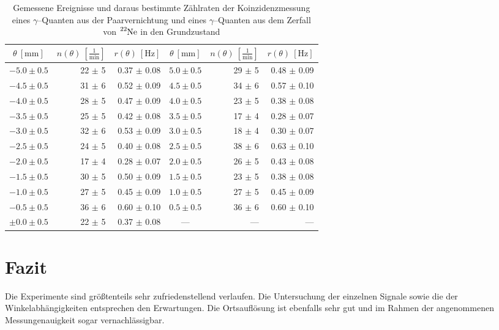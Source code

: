 \documentclass[12pt,a4paper]{scrartcl}
\numberwithin{equation}{section} %
\begin{document}
\begin{table}[h!]
	\centering
	\begin{tabular}{c|r|r||c|r|r}
		$\theta\ [\mathrm{mm}]$ & $n(\theta)\ [\frac{1}{\mathrm{min}}]$ & $r(\theta)\ [\mathrm{Hz}]$ &
			$\theta\ [\mathrm{mm}]$ & $n(\theta)\ [\frac{1}{\mathrm{min}}]$ & $r(\theta)\ [\mathrm{Hz}]$ \\
		\hline 
		$-5.0 \pm 0.5$ & 22 $\pm$ 5 & 0.37 $\pm$ 0.08 &
			$5.0 \pm 0.5$ & 29 $\pm$ 5 & 0.48 $\pm$ 0.09 \\
		$-4.5 \pm 0.5$ & 31 $\pm$ 6 & 0.52 $\pm$ 0.09 &
			$4.5 \pm 0.5$ & 34 $\pm$ 6 & 0.57 $\pm$ 0.10 \\
		$-4.0 \pm 0.5$ & 28 $\pm$ 5 & 0.47 $\pm$ 0.09 &
			$4.0 \pm 0.5$ & 23 $\pm$ 5 & 0.38 $\pm$ 0.08 \\
		$-3.5 \pm 0.5$ & 25 $\pm$ 5 & 0.42 $\pm$ 0.08 &
			$3.5 \pm 0.5$ & 17 $\pm$ 4 & 0.28 $\pm$ 0.07 \\
		$-3.0 \pm 0.5$ & 32 $\pm$ 6 & 0.53 $\pm$ 0.09 &
			$3.0 \pm 0.5$ & 18 $\pm$ 4 & 0.30 $\pm$ 0.07 \\
		$-2.5 \pm 0.5$ & 24 $\pm$ 5 & 0.40 $\pm$ 0.08 &
			$2.5 \pm 0.5$ & 38 $\pm$ 6 & 0.63 $\pm$ 0.10 \\
		$-2.0 \pm 0.5$ & 17 $\pm$ 4 & 0.28 $\pm$ 0.07 &
			$2.0 \pm 0.5$ & 26 $\pm$ 5 & 0.43 $\pm$ 0.08 \\
		$-1.5 \pm 0.5$ & 30 $\pm$ 5 & 0.50 $\pm$ 0.09 &
			$1.5 \pm 0.5$ & 23 $\pm$ 5 & 0.38 $\pm$ 0.08 \\
		$-1.0 \pm 0.5$ & 27 $\pm$ 5 & 0.45 $\pm$ 0.09 &
			$1.0 \pm 0.5$ & 27 $\pm$ 5 & 0.45 $\pm$ 0.09 \\
		$-0.5 \pm 0.5$ & 36 $\pm$ 6 & 0.60 $\pm$ 0.10 &
			$0.5 \pm 0.5$ & 36 $\pm$ 6 & 0.60 $\pm$ 0.10 \\
		$\pm 0.0 \pm 0.5$ & 22 $\pm$ 5 & 0.37 $\pm$ 0.08 &---&---&---
	\end{tabular}
	\caption{Gemessene Ereignisse und daraus bestimmte Zählraten der Koinzidenzmessung eines $\gamma$--Quanten aus der Paarvernichtung und eines $\gamma$--Quanten aus dem Zerfall von $\ce{^{22}Ne}$ in den Grundzustand}
	\label{table:messwerte1275}
\end{table}

\clearpage
\hypertarget{fazit}{%
\section{Fazit}\label{fazit}}
Die Experimente sind größtenteils sehr zufriedenstellend verlaufen. Die Untersuchung der einzelnen Signale sowie die der Winkelabhängigkeiten entsprechen den Erwartungen. Die Ortsauflösung ist ebenfalls sehr gut und im Rahmen der angenommenen Messungenauigkeit sogar vernachlässigbar.
\end{document}
